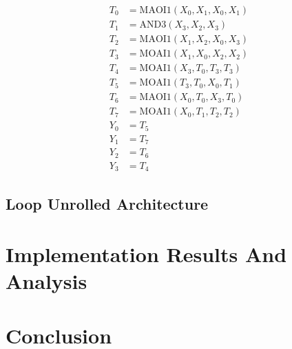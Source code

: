 \documentclass[sn-basic]{sn-jnl}%
\begin{document}
\begin{align}
    T_0 &= \text{MAOI1}(X_0, X_1, X_0, X_1) \nonumber \\
    T_1 &= \text{AND3}(X_3, X_2, X_3) \nonumber \\
    T_2 &= \text{MAOI1}(X_1, X_2, X_0, X_3) \nonumber \\
    T_3 &= \text{MOAI1}(X_1, X_0, X_2, X_2) \nonumber \\
    T_4 &= \text{MOAI1}(X_3, T_0, T_3, T_3) \nonumber \\
    T_5 &= \text{MOAI1}(T_3, T_0, X_0, T_1) \nonumber \\
    T_6 &= \text{MAOI1}(X_0, T_0, X_3, T_0) \nonumber \\
    T_7 &= \text{MOAI1}(X_0, T_1, T_2, T_2) \nonumber \\
    Y_0 &= T_5 \nonumber \\
    Y_1 &= T_7 \nonumber \\
    Y_2 &= T_6 \nonumber \\
    Y_3 &= T_4 \label{eq2}
\end{align}

\subsection{Loop Unrolled Architecture}\label{subsec3}

\section{Implementation Results And Analysis}\label{sec4}

\section{Conclusion}\label{sec5}

\end{document}
